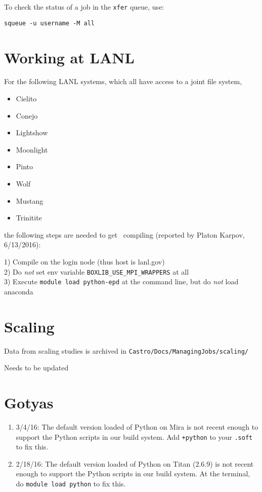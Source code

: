 To check the status of a job in the {\tt xfer} queue, use:                      
\begin{verbatim}                                                                
squeue -u username -M all                                                       
\end{verbatim}           



\section{Working at LANL}

For the following LANL systems, which all have access to a joint file system,
\begin{itemize}
  \item Cielito
  \item Conejo
  \item Lightshow
  \item Moonlight
  \item Pinto
  \item Wolf
  \item Mustang
  \item Trinitite
\end{itemize}
the following steps are needed to get \castro\ compiling (reported by Platon Karpov, 6/13/2016):

1) Compile on the login node (thus host is lanl.gov)\\
2) Do \textit{not} set env variable \texttt{BOXLIB\_USE\_MPI\_WRAPPERS} at all\\
3) Execute \texttt{module load python-epd} at the command line, but do \textit{not} load anaconda\\


\section{Scaling}

Data from scaling studies is archived in {\tt Castro/Docs/ManagingJobs/scaling/}

Needs to be updated



\section{Gotyas}

\begin{enumerate}

\item 3/4/16: The default version loaded of Python on Mira is not
  recent enough to support the Python scripts in our build system. Add
  {\tt +python} to your {\tt .soft} to fix this.

\item 2/18/16: The default version loaded of Python on Titan (2.6.9)
  is not recent enough to support the Python scripts in our build
  system. At the terminal, do {\tt module load python} to fix this.


\end{enumerate}

